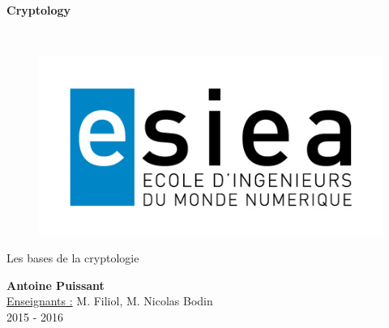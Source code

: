 \begin{titlepage}
      \begin{center}   
        \Huge
        \textbf{Cryptology}
        
        \LARGE
        ~
        
        
        \vfill
        \begin{figure}[H]
	    \centering
	    \begin{minipage}{0.9\textwidth}
		\centering
		\includegraphics[width=\textwidth]{./img/esiea.jpeg}
	    \end{minipage}\hfill
	\end{figure}
        \vfill
        
        \vspace{0.5cm}
        
        Les bases de la cryptologie
        
        \vspace{2cm}
        \textbf{Antoine Puissant}\\
        \vspace{0.8cm}
        \Large
        \underline{Enseignants :} M. Filiol, M. Nicolas Bodin\\
        \vspace{0.5cm}
        2015 - 2016%
        
    \end{center}
\end{titlepage}